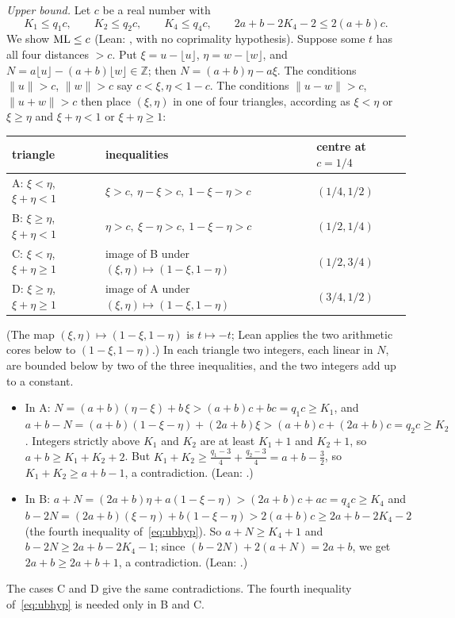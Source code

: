 \documentclass[11pt]{article}
\theoremstyle{remark}
\newcommand{\dist}[1]{\lVert #1\rVert}
\newcommand{\lean}[1]{{\small\texttt{\detokenize{#1}}}}
\begin{document}
\emph{Upper bound.} Let $c$ be a real number with
\begin{equation}\label{eq:ubhyp}
K_1\le q_1c,\qquad K_2\le q_2c,\qquad K_4\le q_4c,\qquad 2a+b-2K_4-2\le 2(a+b)c .
\end{equation}
We show $\mathrm{ML}\le c$ (Lean: \lean{ub_ML}, with no coprimality hypothesis). Suppose some $t$ has all four distances $>c$. Put $\xi=u-\lfloor u\rfloor$, $\eta=w-\lfloor w\rfloor$, and $N=a\lfloor u\rfloor-(a+b)\lfloor w\rfloor\in\mathbb Z$; then $N=(a+b)\eta-a\xi$. The conditions $\dist u>c$, $\dist w>c$ say $c<\xi,\eta<1-c$. The conditions $\dist{u-w}>c$, $\dist{u+w}>c$ then place $(\xi,\eta)$ in one of four triangles, according as $\xi<\eta$ or $\xi\ge\eta$ and $\xi+\eta<1$ or $\xi+\eta\ge1$:
\begin{center}
\begin{tabular}{lll}
\toprule
triangle & inequalities & centre at $c=1/4$\\
\midrule
A: $\xi<\eta$, $\xi+\eta<1$ & $\xi>c,\ \eta-\xi>c,\ 1-\xi-\eta>c$ & $(1/4,1/2)$\\
B: $\xi\ge\eta$, $\xi+\eta<1$ & $\eta>c,\ \xi-\eta>c,\ 1-\xi-\eta>c$ & $(1/2,1/4)$\\
C: $\xi<\eta$, $\xi+\eta\ge1$ & image of B under $(\xi,\eta)\mapsto(1-\xi,1-\eta)$ & $(1/2,3/4)$\\
D: $\xi\ge\eta$, $\xi+\eta\ge1$ & image of A under $(\xi,\eta)\mapsto(1-\xi,1-\eta)$ & $(3/4,1/2)$\\
\bottomrule
\end{tabular}
\end{center}
(The map $(\xi,\eta)\mapsto(1-\xi,1-\eta)$ is $t\mapsto-t$; Lean applies the two arithmetic cores below to $(1-\xi,1-\eta)$.) In each triangle two integers, each linear in $N$, are bounded below by two of the three inequalities, and the two integers add up to a constant.
\begin{itemize}
\item In A: $N=(a+b)(\eta-\xi)+b\,\xi>(a+b)c+bc=q_1c\ge K_1$, and $a+b-N=(a+b)(1-\xi-\eta)+(2a+b)\xi>(a+b)c+(2a+b)c=q_2c\ge K_2$. Integers strictly above $K_1$ and $K_2$ are at least $K_1+1$ and $K_2+1$, so $a+b\ge K_1+K_2+2$. But $K_1+K_2\ge\frac{q_1-3}4+\frac{q_2-3}4=a+b-\frac32$, so $K_1+K_2\ge a+b-1$, a contradiction. (Lean: \lean{core1}.)
\item In B: $a+N=(2a+b)\eta+a(1-\xi-\eta)>(2a+b)c+ac=q_4c\ge K_4$ and $b-2N=(2a+b)(\xi-\eta)+b(1-\xi-\eta)>2(a+b)c\ge 2a+b-2K_4-2$ (the fourth inequality of~\eqref{eq:ubhyp}). So $a+N\ge K_4+1$ and $b-2N\ge 2a+b-2K_4-1$; since $(b-2N)+2(a+N)=2a+b$, we get $2a+b\ge 2a+b+1$, a contradiction. (Lean: \lean{core3}.)
\end{itemize}
The cases C and D give the same contradictions. The fourth inequality of~\eqref{eq:ubhyp} is needed only in B and C.
\end{document}
